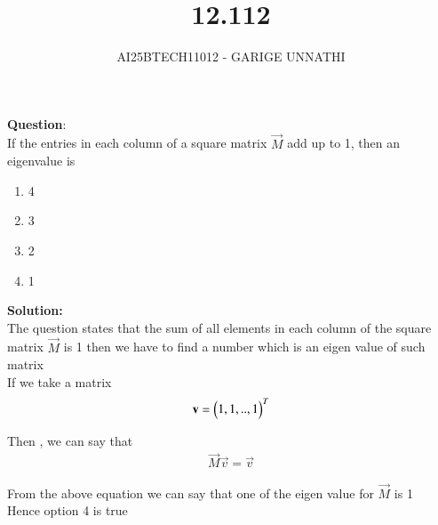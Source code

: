 \documentclass[journal]{IEEEtran}
\begin{document}



\title{12.112}
\author{AI25BTECH11012 - GARIGE UNNATHI}
{\let\newpage\relax\maketitle}


\renewcommand{\thefigure}{\theenumi}
\renewcommand{\thetable}{\theenumi}
\setlength{\intextsep}{10pt} %



\vspace{-1cm}

\textbf{Question}:\\
If the entries in each column of a square matrix $\vec{M}$ add up to 1, then an eigenvalue is
\begin{enumerate}
    \item 4
    \item 3
    \item 2
    \item 1
\end{enumerate}
\textbf{Solution:}\\

The question states that the sum of all elements in each column of the square matrix $\vec{M}$ is 1 then we have to find a number which is an eigen value of such matrix \\

If we take a matrix \\
\begin{align}
    \mathbf{v} = \begin{pmatrix}1,1,..,1\end{pmatrix}^T
\end{align}

Then , we can say that 
\begin{align}
    \vec{M}\vec{v} = \vec{v}
\end{align}

From the above equation we can say that one of the eigen value for $\vec{M}$ is 1\\
Hence option 4 is true
\end{document}
